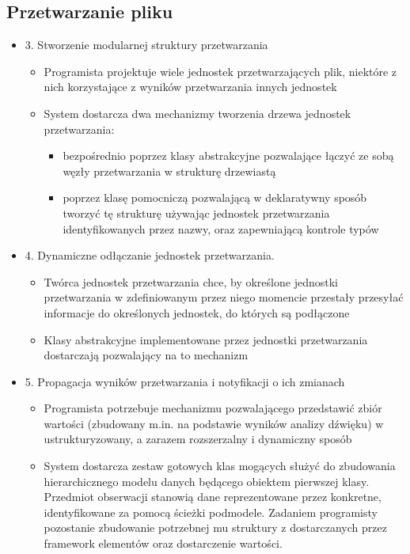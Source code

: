 \subsection{Przetwarzanie pliku}
\begin{itemize}
	\item 3. Stworzenie modularnej struktury przetwarzania
	\begin{itemize}
	\item Programista projektuje wiele jednostek przetwarzających plik, niektóre z nich korzystające z wyników przetwarzania innych jednostek
	\item System dostarcza dwa mechanizmy tworzenia drzewa jednostek przetwarzania:
		\begin{itemize}
			\item bezpośrednio poprzez klasy abstrakcyjne pozwalające łączyć ze sobą węzły przetwarzania w strukturę drzewiastą
			\item poprzez klasę pomocniczą pozwalającą w deklaratywny sposób tworzyć tę strukturę używając jednostek przetwarzania identyfikowanych przez nazwy, oraz zapewniającą kontrole typów
		\end{itemize}
	\end{itemize}
	\item 4. Dynamiczne odłączanie jednostek przetwarzania.
	\begin{itemize}
		\item Twórca jednostek przetwarzania chce, by określone jednostki przetwarzania w zdefiniowanym przez niego momencie przestały przesyłać informacje do określonych jednostek, do których są podłączone
		\item Klasy abstrakcyjne implementowane przez jednostki przetwarzania dostarczają pozwalający na to mechanizm
	\end{itemize}
	\item 5. Propagacja wyników przetwarzania i notyfikacji o ich zmianach
	\begin{itemize}
		\item Programista potrzebuje mechanizmu pozwalającego przedstawić zbiór wartości (zbudowany m.in. na podstawie wyników analizy dźwięku) w ustrukturyzowany, a zarazem rozszerzalny i dynamiczny sposób
		\item System dostarcza zestaw gotowych klas mogących służyć do zbudowania hierarchicznego modelu danych będącego obiektem pierwszej klasy. Przedmiot obserwacji stanowią dane reprezentowane przez konkretne, identyfikowane za pomocą ścieżki podmodele. Zadaniem programisty pozostanie zbudowanie potrzebnej mu struktury z dostarczanych przez framework elementów oraz dostarczenie wartości.

\end{itemize}
\end{itemize}
